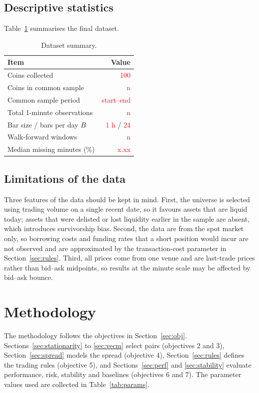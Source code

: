 \documentclass[10pt,a4paper,twocolumn]{article}
\newcommand{\TBD}[1]{\textcolor{red}{#1}}
\begin{document}
	\subsection{Descriptive statistics}
	Table~\ref{tab:desc} summarises the final dataset.
	
	\begin{table}[htbp]
		\centering
		\small
		\caption{Dataset summary.}
		\label{tab:desc}
		\begin{tabularx}{\columnwidth}{@{}Xr@{}}
			\toprule
			Item & Value \\
			\midrule
			Coins collected & \TBD{100} \\
			Coins in common sample & \TBD{n} \\
			Common sample period & \TBD{start--end} \\
			Total 1-minute observations & \TBD{n} \\
			Bar size / bars per day $B$ & \TBD{1 h} / \TBD{24} \\
			Walk-forward windows & \TBD{n} \\
			Median missing minutes (\%) & \TBD{x.xx} \\
			\bottomrule
		\end{tabularx}
	\end{table}
	
	\subsection{Limitations of the data}
	Three features of the data should be kept in mind. First, the universe is selected using trading volume on a single recent date, so it favours assets that are liquid today; assets that were delisted or lost liquidity earlier in the sample are absent, which introduces survivorship bias. Second, the data are from the spot market only, so borrowing costs and funding rates that a short position would incur are not observed and are approximated by the transaction-cost parameter in Section~\ref{sec:rules}. Third, all prices come from one venue and are last-trade prices rather than bid--ask midpoints, so results at the minute scale may be affected by bid--ask bounce.
	
	\section{Methodology}
	\label{sec:method}
	The methodology follows the objectives in Section~\ref{sec:obj}. Sections~\ref{sec:stationarity} to \ref{sec:vecm} select pairs (objectives 2 and 3), Section~\ref{sec:spread} models the spread (objective 4), Section~\ref{sec:rules} defines the trading rules (objective 5), and Sections~\ref{sec:perf} and \ref{sec:stability} evaluate performance, risk, stability and baselines (objectives 6 and 7). The parameter values used are collected in Table~\ref{tab:params}.
	
\end{document}
